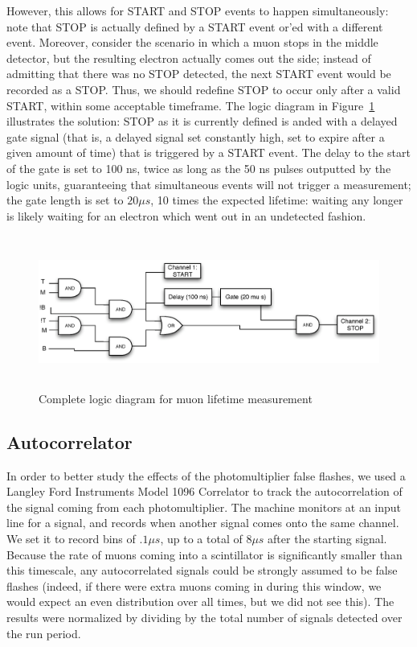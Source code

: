 However, this allows for START and STOP events to happen simultaneously: note that STOP is actually defined by a START event or'ed with a different event. Moreover, consider the scenario in which a muon stops in the middle detector, but the resulting electron actually comes out the side; instead of admitting that there was no STOP detected, the next START event would be recorded as a STOP. Thus, we should redefine STOP to occur only after a valid START, within some acceptable timeframe. The logic diagram in Figure~\ref{figure:logic} illustrates the solution: STOP as it is currently defined is anded with a delayed gate signal (that is, a delayed signal set constantly high, set to expire after a given amount of time) that is triggered by a START event. The delay to the start of the gate is set to 100 ns, twice as long as the 50 ns pulses outputted by the logic units, guaranteeing that simultaneous events will not trigger a measurement; the gate length is set to $20 \mu s$, 10 times the expected lifetime: waiting any longer is likely waiting for an electron which went out in an undetected fashion.

\begin{figure}[htbp]
\begin{center}
\includegraphics[height=50mm]{./figures/logicdiagram.eps}
\caption{Complete logic diagram for muon lifetime measurement}
\label{figure:logic}
\end{center}
\end{figure}


\subsection{Autocorrelator}
\label{autocorrelator}
In order to better study the effects of the photomultiplier false flashes, we used a Langley Ford Instruments Model 1096 Correlator to track the autocorrelation of the signal coming from each photomultiplier. The machine monitors at an input line for a signal, and records when another signal comes onto the same channel. We set it to record bins of $.1 \mu s$, up to a total of $8 \mu s$ after the starting signal. Because the rate of muons coming into a scintillator is significantly smaller than this timescale, any autocorrelated signals could be strongly assumed to be false flashes (indeed, if there were extra muons coming in during this window, we would expect an even distribution over all times, but we did not see this). The results were normalized by dividing by the total number of signals detected over the run period.

